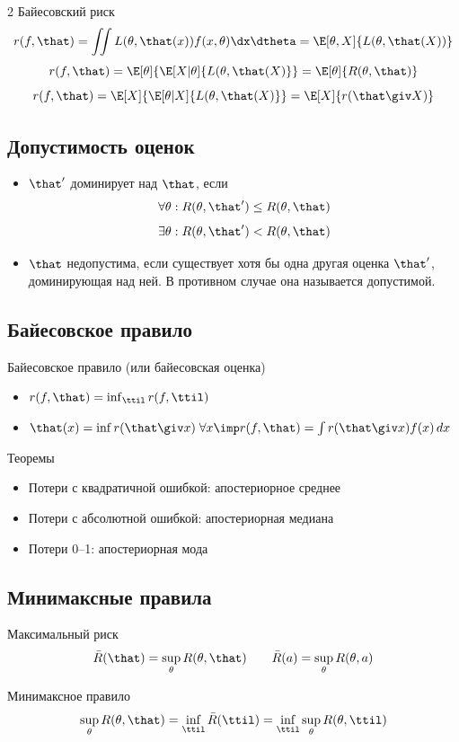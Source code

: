 \documentclass[landscape]{article}
\begin{document}
\begin{multicols*}{2}
Байесовский риск
\[r(f,\that)
= \iint L(\theta,\that(x))f(x,\theta)\dx\dtheta
= \E[\theta,X]{L(\theta,\that(X))}\]
\[r(f,\that)
= \E[\theta]{\E[X|\theta]{L(\theta,\that(X)}}
= \E[\theta]{R(\theta,\that)}\]
\[r(f,\that)
= \E[X]{\E[\theta|X]{L(\theta,\that(X)}}
= \E[X]{r(\that\giv X)}\]

\subsection{Допустимость оценок}

\begin{itemize}
  \item $\that'$ доминирует над $\that$, если
    \[\forall \theta: R(\theta,\that') \le R(\theta,\that)\]
    \[\exists \theta: R(\theta,\that') < R(\theta,\that)\]
  \item $\that$ недопустима, если существует хотя бы одна другая оценка
    $\that'$, доминирующая над ней. В противном случае она называется допустимой.
\end{itemize}

\subsection{Байесовское правило}

Байесовское правило (или байесовская оценка)
\begin{itemize}
  \item $r(f,\that) = \inf_{\ttil} r(f,\ttil)$
  \item $\that(x) = \inf r(\that\giv x) \; \forall x
\imp r(f,\that) = \int r(\that\giv x)f(x)\,dx$
\end{itemize}

Теоремы
\begin{itemize}
  \item Потери с квадратичной ошибкой: апостериорное среднее
  \item Потери с абсолютной ошибкой: апостериорная медиана
  \item Потери 0–1: апостериорная мода
\end{itemize}

\subsection{Минимаксные правила}

Максимальный риск
\[\bar{R}(\that) = \sup_\theta R(\theta,\that) \qquad
\bar{R}(a) = \sup_\theta R(\theta,a)\]

Минимаксное правило
\[\sup_\theta R(\theta,\that)
= \inf_{\ttil} \bar{R}(\ttil)
= \inf_{\ttil} \sup_\theta R(\theta,\ttil)\]


\end{multicols*}
\end{document}
